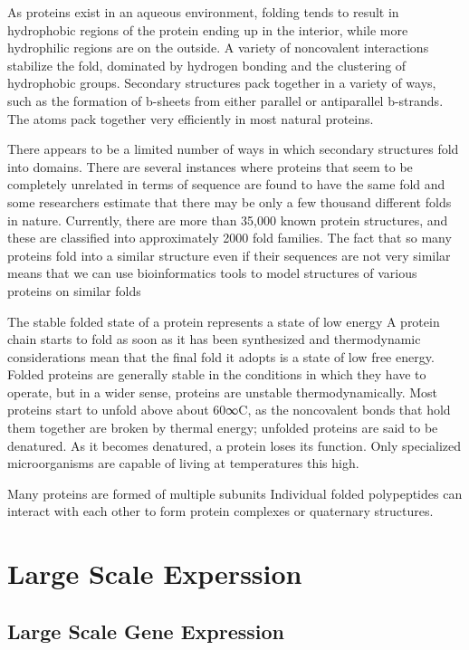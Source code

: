 \documentclass{article}
\begin{document}
As proteins exist in an aqueous environment, folding tends to result in hydrophobic regions of the protein ending up in the interior, while more hydrophilic regions are on the outside. A variety of noncovalent interactions stabilize the fold, dominated by hydrogen bonding and the clustering of hydrophobic groups. Secondary structures pack together in a variety of ways, such as the formation of b-sheets from either parallel or antiparallel b-strands. The atoms pack together very efficiently in most natural proteins.

There appears to be a limited number of ways in which secondary structures fold into domains. There are several instances where proteins that seem to be completely unrelated in terms of sequence are found to have the same fold and some researchers estimate that there may be only a few thousand different folds in nature. Currently, there are more than 35,000 known protein structures, and these are classified into approximately 2000 fold families. The fact that so many proteins fold into a similar structure even if their sequences are not very similar means that we can use bioinformatics tools to model structures of various proteins on similar folds

The stable folded state of a protein represents a state of low energy
A protein chain starts to fold as soon as it has been synthesized and thermodynamic considerations mean that the final fold it adopts is a state of low free energy. Folded proteins are generally stable in the conditions in which they have to operate, but in a wider sense, proteins are unstable thermodynamically. Most proteins start to unfold above about 60∞C, as the noncovalent bonds that hold them together are broken by thermal energy; unfolded proteins are said to be denatured. As it becomes denatured, a protein loses its function. Only specialized microorganisms are capable of living at temperatures this high.


Many proteins are formed of multiple subunits
Individual folded polypeptides can interact with each other to form protein complexes or quaternary structures.


\section{Large Scale Experssion}

\subsection{Large Scale Gene Expression}
\end{document}

